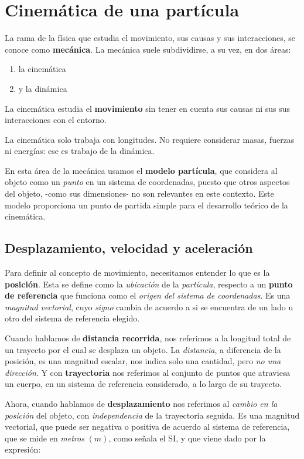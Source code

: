 \section{Cinemática de una partícula}

La rama de la física que estudia el movimiento,
sus causas y sus interacciones,
se conoce como \textbf{mecánica}.
La mecánica suele subdividirse,
a su vez,
en dos áreas:
\begin{enumerate}
    \item la cinemática 
    \item y la dinámica 
\end{enumerate}

La cinemática estudia el \textbf{movimiento} sin tener en cuenta sus causas ni sus
sus interacciones con el entorno.

La cinemática solo trabaja con longitudes.
No requiere considerar masas, fuerzas ni energías:
ese es trabajo de la dinámica.

En esta área de la mecánica usamos el \textbf{modelo partícula},
que considera al objeto como un \textit{punto} en un sistema de coordenadas,
puesto que otros aspectos del objeto,
-como sus dimensiones-
no son relevantes en este contexto.
Este modelo proporciona un punto de partida simple para el desarrollo teórico de 
la cinemática.

\subsection{Desplazamiento, velocidad y aceleración}

Para definir al concepto de movimiento,
necesitamos entender lo que es la \textbf{posición}.
Esta se define como la \textit{ubicación} de la \textit{partícula},
respecto a un \textbf{punto de referencia}
que funciona como el \textit{origen del sistema de coordenadas}.
Es una \textit{magnitud vectorial},
cuyo \textit{signo} cambia de acuerdo a si se encuentra de un lado u otro 
del sistema de referencia elegido.

Cuando hablamos de \textbf{distancia recorrida},
nos referimos a la longitud total de un trayecto por el cual se desplaza un 
objeto.
La \textit{distancia}, a diferencia de la posición, es una magnitud escalar,
nos indica solo una cantidad, pero \textit{no una dirección}.
Y con \textbf{trayectoria} nos referimos al conjunto de puntos que atraviesa 
un cuerpo, en un sistema de referencia considerado,
a lo largo de su trayecto.

Ahora,
cuando hablamos de \textbf{desplazamiento}
nos referimos al \textit{cambio en la posición} del objeto,
con \textit{independencia} de la trayectoria seguida.
Es una magnitud vectorial,
que puede ser negativa o positiva de acuerdo al sistema de referencia,
que se mide en \textit{metros} \((m)\),
como señala el SI,
y que viene dado por la expresión:

